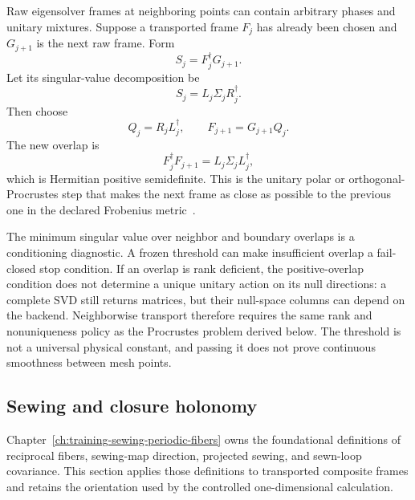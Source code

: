 Raw eigensolver frames at neighboring points can contain arbitrary phases and
unitary mixtures. Suppose a transported frame $F_j$ has already been chosen and
$G_{j+1}$ is the next raw frame. Form
\begin{equation}
  S_j=F_j^{\dagger}G_{j+1}.
  \label{eq:training-composite-neighbor-overlap}
\end{equation}
Let its singular-value decomposition be
\begin{equation}
  S_j=L_j\Sigma_jR_j^{\dagger}.
  \label{eq:training-composite-neighbor-svd}
\end{equation}
Then choose
\begin{equation}
  Q_j=R_jL_j^{\dagger},
  \qquad
  F_{j+1}=G_{j+1}Q_j.
  \label{eq:training-composite-polar-transport}
\end{equation}
The new overlap is
\begin{equation}
  F_j^{\dagger}F_{j+1}
  =L_j\Sigma_jL_j^{\dagger},
  \label{eq:training-composite-positive-overlap}
\end{equation}
which is Hermitian positive semidefinite. This is the unitary polar or
orthogonal-Procrustes step that makes the next frame as close as possible to the
previous one in the declared Frobenius metric~\cite{schonemann1966,higham1986}.

The minimum singular value over neighbor and boundary overlaps is a conditioning
diagnostic. A frozen threshold can make insufficient overlap a fail-closed stop
condition. If an overlap is rank deficient, the positive-overlap condition does
not determine a unique unitary action on its null directions: a complete SVD
still returns matrices, but their null-space columns can depend on the backend.
Neighborwise transport therefore requires the same rank and nonuniqueness policy
as the Procrustes problem derived below. The threshold is not a universal
physical constant, and passing it does not prove continuous smoothness between
mesh points.

\subsection{Sewing and closure holonomy}

Chapter~\ref{ch:training-sewing-periodic-fibers} owns the foundational
definitions of reciprocal fibers, sewing-map direction, projected sewing, and
sewn-loop covariance. This section applies those definitions to transported
composite frames and retains the orientation used by the controlled
one-dimensional calculation.

